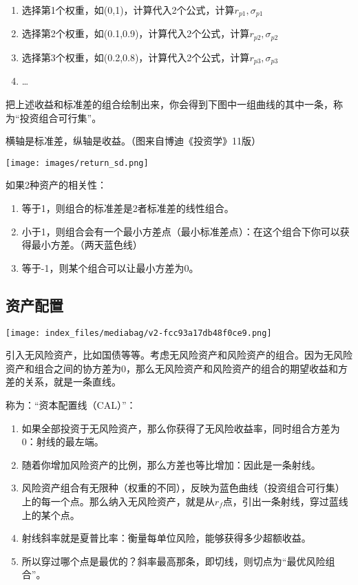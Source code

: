 \documentclass[
  letterpaper,
  DIV=11,
  numbers=noendperiod]{scrreprt}
\providecommand{\tightlist}{%
  \setlength{\itemsep}{0pt}\setlength{\parskip}{0pt}}\usepackage{longtable,booktabs,array}
\begin{document}
\begin{enumerate}
\def\labelenumi{\arabic{enumi}.}
\tightlist
\item
  选择第1个权重，如(0,1)，计算代入2个公式，计算\(r_{p1},\sigma_{p1}\)
\item
  选择第2个权重，如(0.1,0.9)，计算代入2个公式，计算\(r_{p2},\sigma_{p2}\)
\item
  选择第3个权重，如(0.2,0.8)，计算代入2个公式，计算\(r_{p3},\sigma_{p3}\)
\item
  \ldots{}
\end{enumerate}

把上述收益和标准差的组合绘制出来，你会得到下图中一组曲线的其中一条，称为``投资组合可行集''。

横轴是标准差，纵轴是收益。（图来自博迪《投资学》11版）

\texttt{[image: images/return\_sd.png]}

如果2种资产的相关性：

\begin{enumerate}
\def\labelenumi{\arabic{enumi}.}
\tightlist
\item
  等于1，则组合的标准差是2者标准差的线性组合。
\item
  小于1，则组合会有一个最小方差点（最小标准差点）：在这个组合下你可以获得最小方差。（两天蓝色线）
\item
  等于-1，则某个组合可以让最小方差为0。
\end{enumerate}

\hypertarget{ux8d44ux4ea7ux914dux7f6e}{%
\subsection{资产配置}\label{ux8d44ux4ea7ux914dux7f6e}}

\texttt{[image: index\_files/mediabag/v2-fcc93a17db48f0ce9.png]}

引入无风险资产，比如国债等等。考虑无风险资产和风险资产的组合。因为无风险资产和组合之间的协方差为0，那么无风险资产和风险资产的组合的期望收益和方差的关系，就是一条直线。

称为：``资本配置线（CAL）''：

\begin{enumerate}
\def\labelenumi{\arabic{enumi}.}
\tightlist
\item
  如果全部投资于无风险资产，那么你获得了无风险收益率，同时组合方差为0：射线的最左端。
\item
  随着你增加风险资产的比例，那么方差也等比增加：因此是一条射线。
\item
  风险资产组合有无限种（权重的不同），反映为蓝色曲线（投资组合可行集）上的每一个点。那么纳入无风险资产，就是从\(r_f\)点，引出一条射线，穿过蓝线上的某个点。
\item
  射线斜率就是夏普比率：衡量每单位风险，能够获得多少超额收益。
\item
  所以穿过哪个点是最优的？斜率最高那条，即切线，则切点为``最优风险组合''。
\end{enumerate}
\end{document}
